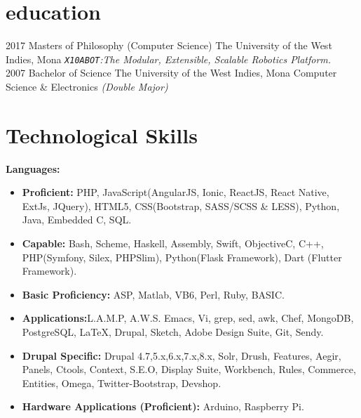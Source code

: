 \documentclass[]{friggeri-cv} %
\begin{document}
\section{education}

\begin{entrylist}
\entry
{2017}
{Masters {\normalfont of Philosophy (Computer Science)}}
{The University of the West Indies, Mona}
{\emph{\texttt{X10ABOT}:The Modular, Extensible, Scalable Robotics Platform.}} \\
\entry
{2007}
{Bachelor {\normalfont of Science}}
{The University of the West Indies, Mona}
{Computer Science \& Electronics \emph{(Double Major)}}
\end{entrylist}


\section{Technological Skills}
\textbf{Languages:}
\begin{itemize}
\item \textbf{Proficient: }PHP, JavaScript(AngularJS, Ionic, ReactJS, React Native, ExtJs, JQuery), HTML5, CSS(Bootstrap, SASS/SCSS \& LESS), Python, Java, Embedded C, SQL.
\item \textbf{Capable: }Bash, Scheme, Haskell, Assembly, Swift, Objective\-C, C++, PHP(Symfony, Silex, PHPSlim), Python(Flask Framework), Dart (Flutter Framework).
\item \textbf{Basic Proficiency: }ASP, Matlab, VB6, Perl, Ruby, BASIC.
\item \textbf{Applications:}L.A.M.P, A.W.S. Emacs, Vi, grep, sed, awk, Chef, MongoDB, PostgreSQL, \LaTeX, Drupal, Sketch, Adobe Design Suite, Git, Sendy.
\item \textbf{Drupal Specific: } Drupal 4.7,5.x,6.x,7.x,8.x, Solr, Drush, Features, Aegir, Panels, Ctools, Context, S.E.O, Display Suite, Workbench, Rules, Commerce, Entities, Omega, Twitter-Bootstrap, Devshop.
\item \textbf{Hardware Applications (Proficient):} Arduino, Raspberry Pi.
\end{itemize}
\end{document}

